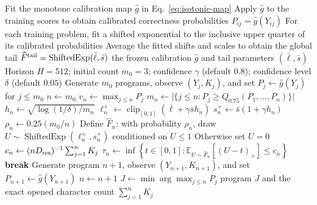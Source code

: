 \begin{algorithm}[H]
\caption{Coding: learn the calibrated law, then stop at its fair cap}
\label{alg:coding}
\footnotesize
\begin{algorithmic}[1]
  \State Fit the monotone calibration map $\widehat g$ in
         Eq.~\eqref{eq:isotonic-map}
  \State Apply $\widehat g$ to the training scores to obtain calibrated
         correctness probabilities $P_{ij}=\widehat g(Y_{ij})$
  \State For each training problem, fit a shifted exponential to the
         inclusive upper quarter of its calibrated probabilities
  \State Average the fitted shifts and scales to obtain the global tail
         $\widehat F^{\rm tail}=\operatorname{ShiftedExp}(\bar\ell,\bar s)$
  \State \Return the frozen calibration $\widehat g$ and tail parameters
         $(\bar\ell,\bar s)$
\EndProcedure
\Statex
{}
  \Require Horizon $H=512$; initial count $m_0=3$; confidence
           $\gamma$ (default $0.8$); confidence level $\delta$ (default $0.05$)
  \State Generate $m_0$ programs, observe $(Y_j,K_j)$, and set
         $P_j\gets\widehat g(Y_j)$ for $j\le m_0$
  \State $n\gets m_0$
    \State $v_n\gets\max_{j\le n}P_j$
    \State $m_n\gets\bigl|\{j\le n:P_j\ge
           Q_{0.75}(P_1,\ldots,P_n)\}\bigr|$
    \State $h_n\gets\sqrt{\log(1/\delta)/m_n}$
    \State $\ell_n^+\gets\operatorname{clip}_{[0,1]}
           (\bar\ell+\gamma\bar s h_n)$
    \State $s_n^+\gets\bar s(1+\gamma h_n)$
    \State $\rho_n\gets0.25(m_0/n)$ 
    \State Define $\widehat F_n$: with probability $\rho_n$, draw
           $U\sim\operatorname{ShiftedExp}(\ell_n^+,s_n^+)$ conditioned on
           $U\le1$
    \Statex \hspace{\algorithmicindent}Otherwise set $U=0$
    \State $c_n\gets(nD_{\rm res})^{-1}\sum_{j=1}^{n}K_j$
    \State $\displaystyle \tau_n\gets\inf\left\{t\in[0,1]:
           \mathbb E_{U\sim\widehat F_n}[(U-t)_+]\le c_n\right\}$
      \State \textbf{break} 
    \EndIf
    \State Generate program $n+1$, observe $(Y_{n+1},K_{n+1})$, and set
           $P_{n+1}\gets\widehat g(Y_{n+1})$
    \State $n\gets n+1$
  \EndWhile
  \State $J\gets\min\arg\max_{j\le n}P_j$
  \State \Return program $J$ and the exact opened character count
         $\sum_{j=1}^{n}K_j$
\EndProcedure
\end{algorithmic}
\end{algorithm}

